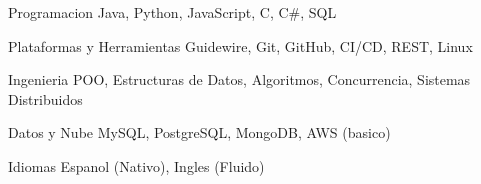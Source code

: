
\begin{cvskills}

  \cvskill
    {Programacion}
    {Java, Python, JavaScript, C, C\#, SQL}

  \cvskill
    {Plataformas y Herramientas}
    {Guidewire, Git, GitHub, CI/CD, REST, Linux}

  \cvskill
    {Ingenieria}
    {POO, Estructuras de Datos, Algoritmos, Concurrencia, Sistemas Distribuidos}

  \cvskill
    {Datos y Nube}
    {MySQL, PostgreSQL, MongoDB, AWS (basico)}

  \cvskill
    {Idiomas}
    {Espanol (Nativo), Ingles (Fluido)}

\end{cvskills}
